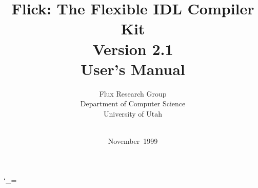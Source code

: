 

\usepackage{fullpage}
\usepackage[obeyspaces]{url}

\renewcommand{\rmdefault}{ptm}
\renewcommand{\sfdefault}{phv}
\renewcommand{\ttdefault}{cmtt}

\catcode`\_=\active



\title{Flick: The Flexible IDL Compiler Kit \\
       Version 2.1 \\[3ex]
       User's Manual}

\author{Flux Research Group \\
        Department of Computer Science \\
        University of Utah \\[2ex]
        \fluxurl \\
        \flickemail}

\date{November~1999}

\makeatletter
\gdef\@copyrightnotice@begin{}
\gdef\@copyrightnotice@end{}
\gdef\@copyrightnotice{}
\def\copyrightnoticebegin#1{\gdef\@copyrightnotice@begin{#1}}
\def\copyrightnoticeend#1{\gdef\@copyrightnotice@end{#1}}
\def\copyrightnotice#1{\gdef\@copyrightnotice{#1}}
\makeatother


